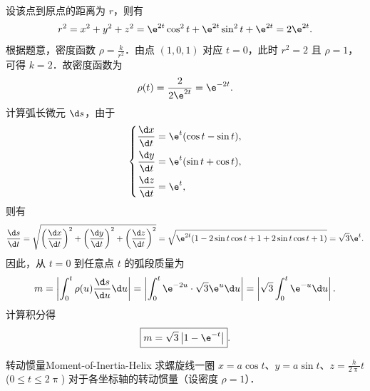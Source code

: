 \begin{solution}
    设该点到原点的距离为 $r$，则有
    \begin{equation}
        r^2 = x^2 + y^2 + z^2 = \e^{2t} \cos^2 t + \e^{2t} \sin^2 t + \e^{2t} = 2\e^{2t}.
    \end{equation}
    根据题意，密度函数 $\rho = \frac{k}{r^2}$．由点 $(1, 0, 1)$ 对应 $t = 0$，此时 $r^2 = 2$ 且 $\rho = 1$，可得 $k = 2$．故密度函数为
    \begin{equation}
        \rho(t) = \frac{2}{2\e^{2t}} = \e^{-2t}.
    \end{equation}
    计算弧长微元 $\d s$，由于
    \begin{equation}
        \left\{ \begin{aligned}
            \frac{\d x}{\d t} & = \e^t (\cos t - \sin t), \\
            \frac{\d y}{\d t} & = \e^t (\sin t + \cos t), \\
            \frac{\d z}{\d t} & = \e^t,
        \end{aligned} \right.
    \end{equation}
    则有
    \begin{equation}
        \frac{\d s}{\d t} = \sqrt{\left(\frac{\d x}{\d t}\right)^2 + \left(\frac{\d y}{\d t}\right)^2 + \left(\frac{\d z}{\d t}\right)^2} = \sqrt{\e^{2t} (1 - 2\sin t \cos t + 1 + 2\sin t \cos t + 1)} = \sqrt{3}\e^t.
    \end{equation}
    因此，从 $t = 0$ 到任意点 $t$ 的弧段质量为
    \begin{equation}
        m = \left| \int_{0}^{t} \rho(u) \frac{\d s}{\d u} \d u \right| = \left| \int_{0}^{t} \e^{-2u} \cdot \sqrt{3}\e^u \d u \right| = \left| \sqrt{3} \int_{0}^{t} \e^{-u} \d u \right| .
    \end{equation}
    计算积分得
    \begin{equation}
        \boxed{m = \sqrt{3} \left|1 - \e^{-t}\right| }.
    \end{equation}
\end{solution}

\begin{problem}{转动惯量}{Moment-of-Inertia-Helix}
    求螺旋线一圈 $x = a \cos t$、$y = a \sin t$、$z = \frac{h}{2\uppi} t$ ($0 \leqslant t \leqslant 2\uppi$) 对于各坐标轴的转动惯量（设密度 $\rho = 1$）．
\end{problem}

